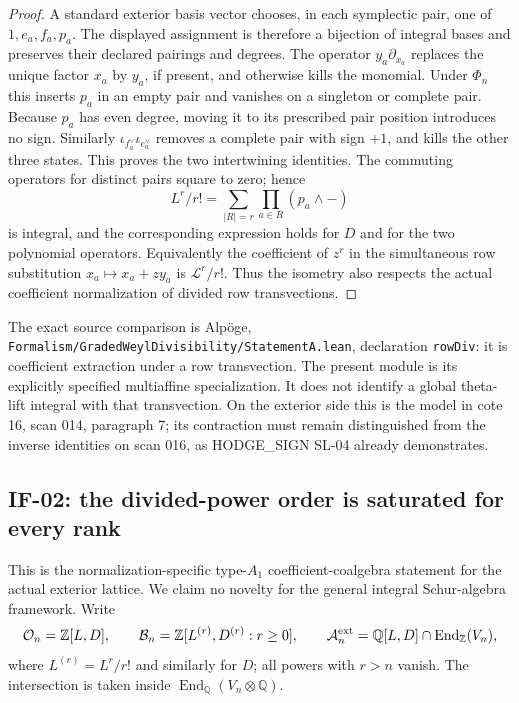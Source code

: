 \begin{proof}
A standard exterior basis vector chooses, in each symplectic pair, one of
$1,e_a,f_a,p_a$. The displayed assignment is therefore a bijection of
integral bases and preserves their declared pairings and degrees.
The operator $y_a\partial_{x_a}$ replaces the unique factor $x_a$ by
$y_a$, if present, and otherwise kills the monomial. Under $\Phi_n$ this
inserts $p_a$ in an empty pair and vanishes on a singleton or complete
pair. Because $p_a$ has even degree, moving it to its prescribed pair
position introduces no sign. Similarly
$\iota_{f_a^\vee}\iota_{e_a^\vee}$ removes a complete pair with sign $+1$,
and kills the other three states. This proves the two intertwining
identities. The commuting operators for distinct pairs square to zero;
hence
\[
 L^r/r!=\sum_{|R|=r}\prod_{a\in R}(p_a\wedge-)
\]
is integral, and the corresponding expression holds for $D$ and for the
two polynomial operators. Equivalently the coefficient of $z^r$ in the
simultaneous row substitution $x_a\mapsto x_a+zy_a$ is
$\mathscr L^r/r!$. Thus the isometry also respects the actual coefficient
normalization of divided row transvections.
\end{proof}

The exact source comparison is Alp\"oge,
\texttt{Formalism/GradedWeylDivisibility/StatementA.lean}, declaration
\texttt{rowDiv}: it is coefficient extraction under a row transvection.
The present module is its explicitly specified multiaffine specialization.
It does not identify a global theta-lift integral with that transvection.
On the exterior side this is the model in cote 16, scan 014, paragraph 7;
its contraction must remain distinguished from the inverse identities on
scan 016, as HODGE\_SIGN SL-04 already demonstrates.

\subsection{IF-02: the divided-power order is saturated for every rank}
This is the normalization-specific type-$A_1$ coefficient-coalgebra
statement for the actual exterior lattice. We claim no novelty for
the general integral Schur-algebra framework.
Write
\[
 \mathcal O_n=\mathbb Z[L,D],\qquad
 \mathcal B_n=\mathbb Z[L^{(r)},D^{(r)}:r\geq0],\qquad
 \mathcal A_n^{\rm ext}=\mathbb Q[L,D]\cap\operatorname{End}_{\mathbb Z}(V_n),
\]
where $L^{(r)}=L^r/r!$ and similarly for $D$; all powers with $r>n$
vanish. The intersection is taken inside
$\operatorname{End}_{\mathbb Q}(V_n\otimes\mathbb Q)$.

